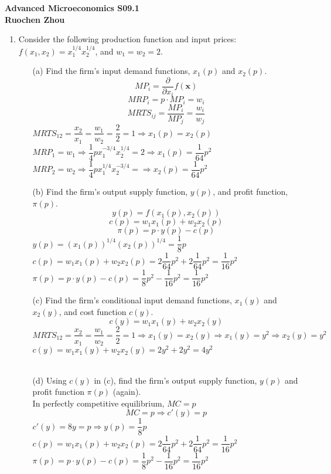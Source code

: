 \documentclass[11pt]{article}
\begin{document}
\begin{center}
\textbf{Advanced Microeconomics S09.1\\}
\textbf{Ruochen Zhou}
\end{center}

\begin{enumerate}
\item Consider the following production function and input prices: $f(x_{1},x_{2})=x_{1}^{1/4}x_{2}^{1/4}$, and $w_{1}=w_{2}=2$.
	\begin{itemize}
	\item[(a)] Find the firm's input demand functions, $x_{1}(p)$ and $x_{2}(p)$.
	\medskip\\
	$$MP_i=\dfrac{\partial}{\partial x_i}f(\textbf{x})$$
    $$MRP_i=p\cdot MP_i=w_i$$
    $$MRTS_{ij}=\dfrac{MP_i}{MP_j}=\dfrac{w_i}{w_j}$$
    $MRTS_{12}=\dfrac{x_2}{x_1}=\dfrac{w_1}{w_2}=\dfrac{2}{2}=1\Rightarrow x_1(p)=x_2(p)$\\
	$MRP_1=w_1\Rightarrow\dfrac{1}{4}px_1^{-3/4}x_2^{1/4}=2\Rightarrow x_1(p)=\dfrac{1}{64}p^2$\\
	$MRP_2=w_2\Rightarrow\dfrac{1}{4}px_1^{1/4}x_2^{-3/4}=\Rightarrow x_2(p)=\dfrac{1}{64}p^2$\\
	\item[(b)] Find the firm's output supply function, $y(p)$, and profit function, $\pi(p)$.
	\medskip\\
	$$y(p)=f(x_1(p),x_2(p))$$
	$$c(p)=w_1x_1(p)+w_2x_2(p)$$
	$$\pi(p)=p\cdot y(p)-c(p)$$
	$y(p)=(x_1(p))^{1/4}(x_2(p))^{1/4}=\dfrac{1}{8}p$\\
	$c(p)=w_1x_1(p)+w_2x_2(p)=2\dfrac{1}{64}p^2+2\dfrac{1}{64}p^2=\dfrac{1}{16}p^2$\\
	$\pi(p)=p\cdot y(p)-c(p)=\dfrac{1}{8}p^2-\dfrac{1}{16}p^2=\dfrac{1}{16}p^2$
	\item[(c)] Find the firm's conditional input demand functions, $x_{1}(y)$ and $x_{2}(y)$, and cost function $c(y)$.
	\medskip\\
	$$c(y)=w_1x_1(y)+w_2x_2(y)$$
	$MRTS_{12}=\dfrac{x_2}{x_1}=\dfrac{w_1}{w_2}=\dfrac{2}{2}=1\Rightarrow x_1(y)=x_2(y)\Rightarrow x_1(y)=y^2\Rightarrow x_2(y)=y^2$\\
	$c(y)=w_1x_1(y)+w_2x_2(y)=2y^2+2y^2=4y^2$\\\\
    \item[(d)] Using $c(y)$ in (c), find the firm's output supply function, $y(p)$ and profit function $\pi(p)$ (again).
    \medskip\\
    In perfectly competitive equilibrium, $MC=p$
    $$MC=p\Rightarrow c'(y)=p$$
    $c'(y)=8y=p\Rightarrow y(p)=\dfrac{1}{8}p$\\
    $c(p)=w_1x_1(p)+w_2x_2(p)=2\dfrac{1}{64}p^2+2\dfrac{1}{64}p^2=\dfrac{1}{16}p^2$\\
    $\pi(p)=p\cdot y(p)-c(p)=\dfrac{1}{8}p^2-\dfrac{1}{16}p^2=\dfrac{1}{16}p^2$
	\end{itemize}


\end{enumerate}
\end{document}
